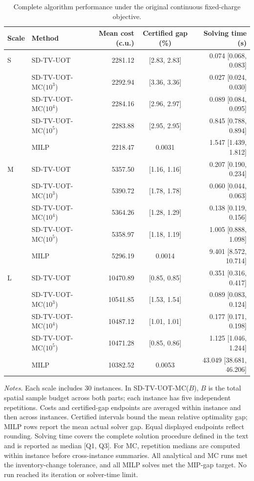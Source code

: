 \documentclass[a4paper,fleqn]{cas-sc}
\theoremstyle{remark}
\theoremstyle{plain}
\begin{document}
\begin{table}[pos=htbp]
\centering
\caption{Complete algorithm performance under the original continuous fixed-charge objective.}
\label{tab:exp1-quality}
\small
\setlength{\tabcolsep}{5pt}
\renewcommand{\arraystretch}{1.15}
\begin{tabular*}{\linewidth}{@{\extracolsep{\fill}}llrcr@{}}
\toprule
Scale & Method & Mean cost (c.u.) & Certified gap (\%) & Solving time (s) \\
\midrule
S & SD-TV-UOT & 2281.12 & [2.83, 2.83] & 0.074 [0.068, 0.083] \\[2pt]
 & SD-TV-UOT-MC($10^3$) & 2292.94 & [3.36, 3.36] & 0.027 [0.024, 0.030] \\[2pt]
 & SD-TV-UOT-MC($10^4$) & 2284.16 & [2.96, 2.97] & 0.089 [0.084, 0.095] \\[2pt]
 & SD-TV-UOT-MC($10^5$) & 2283.88 & [2.95, 2.95] & 0.845 [0.788, 0.894] \\[2pt]
 & MILP & 2218.47 & 0.0031 & 1.547 [1.439, 1.812] \\[2pt]
\midrule
M & SD-TV-UOT & 5357.50 & [1.16, 1.16] & 0.207 [0.190, 0.234] \\[2pt]
 & SD-TV-UOT-MC($10^3$) & 5390.72 & [1.78, 1.78] & 0.060 [0.044, 0.063] \\[2pt]
 & SD-TV-UOT-MC($10^4$) & 5364.26 & [1.28, 1.29] & 0.138 [0.119, 0.156] \\[2pt]
 & SD-TV-UOT-MC($10^5$) & 5358.97 & [1.18, 1.19] & 1.005 [0.888, 1.098] \\[2pt]
 & MILP & 5296.19 & 0.0014 & 9.401 [8.572, 10.714] \\[2pt]
\midrule
L & SD-TV-UOT & 10470.89 & [0.85, 0.85] & 0.351 [0.316, 0.417] \\[2pt]
 & SD-TV-UOT-MC($10^3$) & 10541.85 & [1.53, 1.54] & 0.089 [0.083, 0.124] \\[2pt]
 & SD-TV-UOT-MC($10^4$) & 10487.12 & [1.01, 1.01] & 0.177 [0.171, 0.198] \\[2pt]
 & SD-TV-UOT-MC($10^5$) & 10471.28 & [0.85, 0.86] & 1.125 [1.046, 1.244] \\[2pt]
 & MILP & 10382.52 & 0.0053 & 43.049 [38.681, 46.206] \\[2pt]
\bottomrule
\end{tabular*}
\par\smallskip
\begin{minipage}{\linewidth}
\footnotesize
\textit{Notes.} Each scale includes 30 instances. In SD-TV-UOT-MC($B$), $B$ is the total spatial sample budget across both parts; each instance has five independent repetitions. Costs and certified-gap endpoints are averaged within instance and then across instances. Certified intervals bound the mean relative optimality gap; MILP rows report the mean actual solver gap. Equal displayed endpoints reflect rounding. Solving time covers the complete solution procedure defined in the text and is reported as median [Q1, Q3]. For MC, repetition medians are computed within instance before cross-instance summaries. All analytical and MC runs met the inventory-change tolerance, and all MILP solves met the MIP-gap target. No run reached its iteration or solver-time limit.
\end{minipage}
\end{table}
\end{document}
